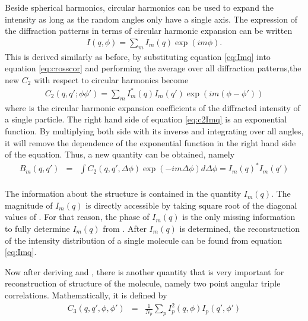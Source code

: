 Beside spherical harmonics, circular harmonics can be used to expand the intensity as long as the random angles only have a single axis. The expression of the diffraction patterns in terms of circular harmonic expansion can be written 
\begin{eqnarray}
I(q,\phi)= \sum_{m} I_{m}(q) \exp(im\phi).
\label{eq:Imq}
\end{eqnarray}
This is derived similarly as before, by substituting equation \ref{eq:Imq} into equation \ref{eq:crosscor} and performing the average over all diffraction patterns,the new $C_{2}$ with respect to circular harmonics become
\begin{eqnarray}
C_{2}(q,q';\phi \phi')=\sum_{m} I^{*}_{m}(q) I_{m}(q') \exp(im(\phi-\phi'))
\label{eq:c2Imq}
\end{eqnarray}
where \Imq is the circular harmonic expansion coefficients of the diffracted intensity of a single particle. The right hand side of equation \ref{eq:c2Imq} 
is an exponential function. By multiplying both side with its inverse and integrating over all angles, it will remove the dependence of the exponential function in the right hand side of the equation. Thus, a new quantity can be obtained, namely
\begin{eqnarray}
B_{m}(q,q')&=&\int C_{2}(q,q',\Delta \phi) \exp(-i m \Delta \phi) d\Delta\phi= I_{m}(q)^{*} I_{m}(q') \\
\label{eq:Bmqdef}
\end{eqnarray}

The information about the structure is contained in the quantity $I_{m}(q)$. The magnitude of $I_{m}(q)$ is directly accessible by taking square root of the diagonal values of \Bmq. For that reason, the phase of $I_{m}(q)$ is the only missing information to fully determine $I_{m}(q)$ from \Bmq. After $I_{m}(q)$ is determined, the reconstruction of the intensity distribution of a single molecule can be found from equation \ref{eq:Imq}. 

Now after deriving \Blq and \Bmq, there is another quantity that is very important for reconstruction of structure of the molecule, namely two point angular triple correlations. Mathematically, it is defined by \cite{kam1978}
\begin{eqnarray}
C_{3}(q,q',\phi,\phi') &=& \frac{1}{N_{p}} \sum_{p} I_{p}^{2}(q,\phi) I_{p}(q',\phi') 
\label{eq:crosstripcor}
\end{eqnarray}

